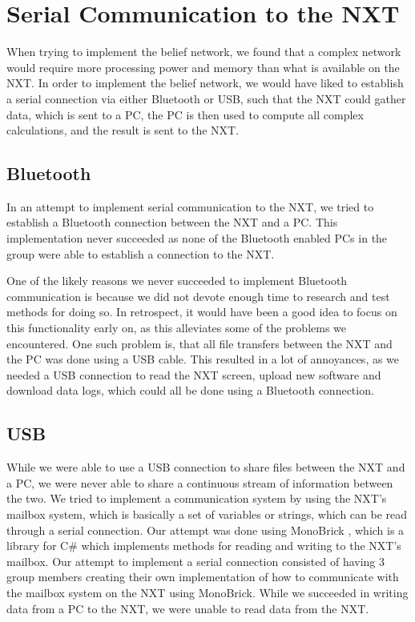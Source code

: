\section{Serial Communication to the NXT}
When trying to implement the belief network, we found that a complex
network would require more processing power and memory than
what is available on the NXT. In order to implement the belief network,
we would have liked to establish a serial connection via either Bluetooth or
USB, such that the NXT could gather data, which is sent to a PC, the PC is then
used to compute all complex calculations, and the result is sent to the
NXT.

\subsection{Bluetooth}
In an attempt to implement serial communication to the NXT, we tried to
establish a Bluetooth connection between the NXT and a PC. This implementation
never succeeded as none of the Bluetooth enabled PCs in the group were able to
establish a connection to the NXT.\nl

One of the likely reasons we never succeeded to implement Bluetooth
communication is because we did not devote enough time to research and test
methods for doing so. In retrospect, it would have been a good idea to focus
on this functionality early on, as this alleviates some of the problems we
encountered. One such problem is, that all file transfers between the NXT and
the PC was done using a USB cable. 
This resulted in a lot of annoyances, as we needed a USB connection to read the
NXT screen, upload new software and download data logs, which could all be done
using a Bluetooth connection.

\subsection{USB}
While we were able to use a USB connection to share files between the NXT and a
PC, we were never able to share a continuous stream of information between the
two. We tried to implement a communication system by using the NXT's mailbox
system, which is basically a set of variables or strings, which can be read
through a serial connection. Our attempt was done using MonoBrick
\cite{MonoBrick}, which is a library for C\# which implements methods for
reading and writing to the NXT's mailbox. Our attempt to implement a serial
connection consisted of having 3 group members creating their own implementation
of how to communicate with the mailbox system on the NXT using MonoBrick. While
we succeeded in writing data from a PC to the NXT, we were unable to read data
from the NXT.

